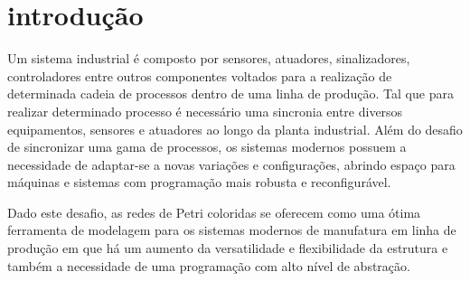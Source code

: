 \chapter{introdução}
\label{chap:introduction}









Um sistema industrial é composto por sensores, atuadores, sinalizadores, controladores entre outros componentes voltados para a realização de determinada cadeia de processos dentro de uma linha de produção. Tal que para realizar determinado processo é necessário uma sincronia entre diversos equipamentos, sensores e atuadores ao longo da planta industrial. Além do desafio de sincronizar uma gama de processos, os sistemas modernos possuem a necessidade de adaptar-se a novas variações e configurações, abrindo espaço para máquinas e sistemas com programação mais robusta e reconfigurável. 

Dado este desafio, as redes de Petri coloridas se oferecem como uma ótima ferramenta de modelagem para os sistemas modernos de manufatura em linha de produção em que há um aumento da versatilidade e flexibilidade da estrutura e também a necessidade de uma programação com alto nível de abstração. \cite{framework}

